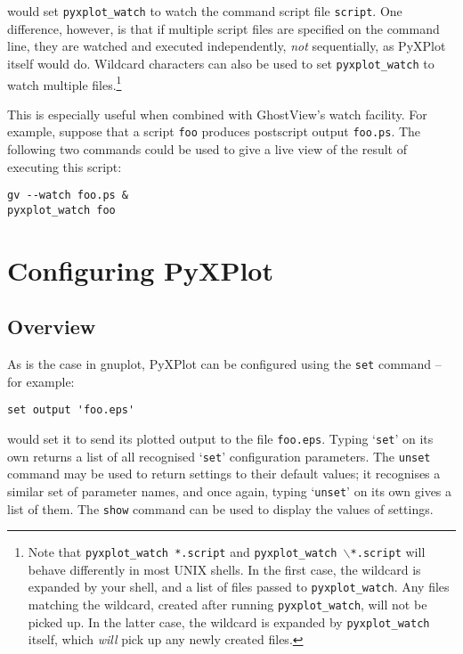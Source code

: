 \documentclass[a4paper,onecolumn,11pt]{book}
\begin{document}
\noindent would set \texttt{pyxplot\_watch} to watch the command script file
\texttt{script}. One difference, however, is that if multiple script files are
specified on the command line, they are watched and executed independently,
\textit{not} sequentially, as PyXPlot itself would do. Wildcard characters can
also be used to set \texttt{pyxplot\_watch} to watch multiple
files.\footnote{Note that \texttt{pyxplot\_watch *.script} and
\texttt{pyxplot\_watch $\backslash$*.script} will behave differently in most
UNIX shells.  In the first case, the wildcard is expanded by your shell, and a
list of files passed to \texttt{pyxplot\_watch}. Any files matching the
wildcard, created after running \texttt{pyxplot\_watch}, will not be picked up.
In the latter case, the wildcard is expanded by \texttt{pyxplot\_watch} itself,
which \textit{will} pick up any newly created files.}

This is especially useful when combined with GhostView's watch facility. For
example, suppose that a script \texttt{foo} produces postscript output
\texttt{foo.ps}. The following two commands could be used to give a live view
of the result of executing this script:

\begin{verbatim}
gv --watch foo.ps &
pyxplot_watch foo
\end{verbatim}

\chapter{Configuring PyXPlot}

\section{Overview}

\label{configuration}

As is the case in gnuplot, PyXPlot can be configured using the \noindent
\texttt{set} command -- for example:

\begin{verbatim}set output 'foo.eps'\end{verbatim}

\noindent would set it to send its plotted output to the file
\texttt{foo.eps}.  Typing `\texttt{set}' on its own returns a list of all
recognised `\texttt{set}' configuration parameters. The \texttt{unset} command
may be used to return settings to their default values; it recognises a similar
set of parameter names, and once again, typing `\texttt{unset}' on its own
gives a list of them. The \texttt{show} command can be used to display the
values of settings.
\end{document}
